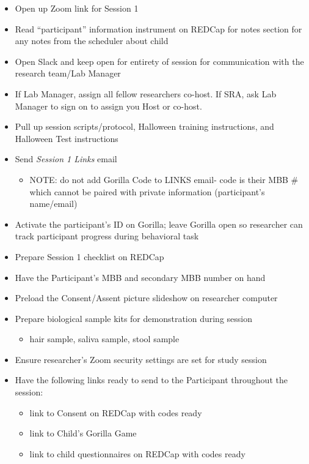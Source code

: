 \documentclass[
]{book}
\providecommand{\tightlist}{%
  \setlength{\itemsep}{0pt}\setlength{\parskip}{0pt}}
\begin{document}
\begin{itemize}
\tightlist
\item
  Open up Zoom link for Session 1
\item
  Read ``participant'' information instrument on REDCap for notes section for any notes from the scheduler about child
\item
  Open Slack and keep open for entirety of session for communication with the research team/Lab Manager
\item
  If Lab Manager, assign all fellow researchers co-host. If SRA, ask Lab Manager to sign on to assign you Host or co-host.
\item
  Pull up session scripts/protocol, Halloween training instructions, and Halloween Test instructions
\item
  Send \emph{Session 1 Links} email

  \begin{itemize}
  \tightlist
  \item
    NOTE: do not add Gorilla Code to LINKS email- code is their MBB \# which cannot be paired with private information (participant's name/email)
  \end{itemize}
\item
  Activate the participant's ID on Gorilla; leave Gorilla open so researcher can track participant progress during behavioral task
\item
  Prepare Session 1 checklist on REDCap
\item
  Have the Participant's MBB and secondary MBB number on hand
\item
  Preload the Consent/Assent picture slideshow on researcher computer
\item
  Prepare biological sample kits for demonstration during session

  \begin{itemize}
  \tightlist
  \item
    hair sample, saliva sample, stool sample
  \end{itemize}
\item
  Ensure researcher's Zoom security settings are set for study session
\item
  Have the following links ready to send to the Participant throughout the session:

  \begin{itemize}
  \tightlist
  \item
    link to Consent on REDCap with codes ready
  \item
    link to Child's Gorilla Game
  \item
    link to child questionnaires on REDCap with codes ready
  \end{itemize}
\end{itemize}
\end{document}

